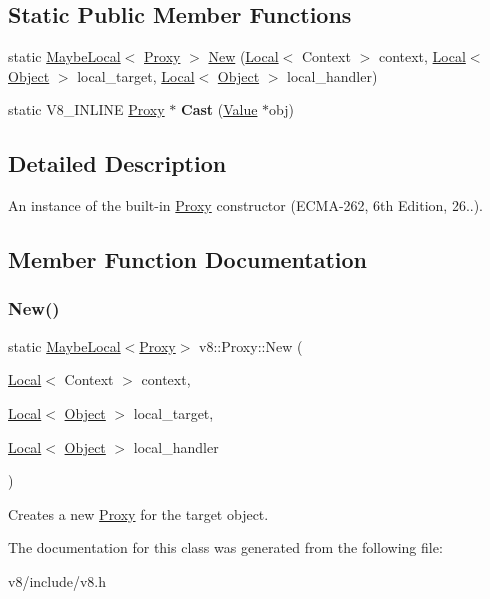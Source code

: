 \subsection*{Static Public Member Functions}
\begin{DoxyCompactItemize}
\item 
static \mbox{\hyperlink{classv8_1_1MaybeLocal}{Maybe\+Local}}$<$ \mbox{\hyperlink{classv8_1_1Proxy}{Proxy}} $>$ \mbox{\hyperlink{classv8_1_1Proxy_ab58d9d98f17d299ca7a487d05e771260}{New}} (\mbox{\hyperlink{classv8_1_1Local}{Local}}$<$ Context $>$ context, \mbox{\hyperlink{classv8_1_1Local}{Local}}$<$ \mbox{\hyperlink{classv8_1_1Object}{Object}} $>$ local\+\_\+target, \mbox{\hyperlink{classv8_1_1Local}{Local}}$<$ \mbox{\hyperlink{classv8_1_1Object}{Object}} $>$ local\+\_\+handler)
\item 
\mbox{\label{classv8_1_1Proxy_a6562478fdedab6fa0fe20ede066b2a78}} 
static V8\+\_\+\+I\+N\+L\+I\+NE \mbox{\hyperlink{classv8_1_1Proxy}{Proxy}} $\ast$ {\bfseries Cast} (\mbox{\hyperlink{classv8_1_1Value}{Value}} $\ast$obj)
\end{DoxyCompactItemize}


\subsection{Detailed Description}
An instance of the built-\/in \mbox{\hyperlink{classv8_1_1Proxy}{Proxy}} constructor (E\+C\+M\+A-\/262, 6th Edition, 26..). 

\subsection{Member Function Documentation}
\mbox{\label{classv8_1_1Proxy_ab58d9d98f17d299ca7a487d05e771260}} 
\subsubsection{\texorpdfstring{New()}{New()}}
{\footnotesize\ttfamily static \mbox{\hyperlink{classv8_1_1MaybeLocal}{Maybe\+Local}}$<$\mbox{\hyperlink{classv8_1_1Proxy}{Proxy}}$>$ v8\+::\+Proxy\+::\+New (\begin{DoxyParamCaption}\item[{\mbox{\hyperlink{classv8_1_1Local}{Local}}$<$ Context $>$}]{context,  }\item[{\mbox{\hyperlink{classv8_1_1Local}{Local}}$<$ \mbox{\hyperlink{classv8_1_1Object}{Object}} $>$}]{local\+\_\+target,  }\item[{\mbox{\hyperlink{classv8_1_1Local}{Local}}$<$ \mbox{\hyperlink{classv8_1_1Object}{Object}} $>$}]{local\+\_\+handler }\end{DoxyParamCaption})\hspace{0.3cm}{\ttfamily [static]}}

Creates a new \mbox{\hyperlink{classv8_1_1Proxy}{Proxy}} for the target object. 

The documentation for this class was generated from the following file\+:\begin{DoxyCompactItemize}
\item 
v8/include/v8.\+h\end{DoxyCompactItemize}
